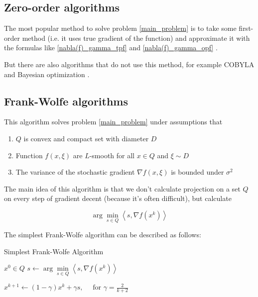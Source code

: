 \documentclass{article}
\begin{document}
    \subsection{Zero-order algorithms}\label{Zero_order_methods}

        The most popular method to solve problem \eqref{main_problem} is to take some first-order method (i.e. it uses true gradient of the function) and approximate it with the formulas like \eqref{nabla(f)_gamma_tpf} and \eqref{nabla(f)_gamma_opf} \cite{Randomized_gradient_free_methods_in_convex_optimization, akhtar2022zeroth, nesterov2017random, gasnikov2017stochastic}.

        But there are also algorithms that do not use this method, for example COBYLA \cite{powell1994direct} and Bayesian optimization \cite{hernandez2016general}.

        

    \subsection{Frank-Wolfe algorithms} \label{FW_algorithms}

        This algorithm solves problem \eqref{main_problem} under assumptions that
        
        \begin{enumerate}
            \item $Q$ is convex and compact set with diameter $D$

            \item Function $f(x, \xi)$ are $L$-smooth for all $x \in Q$ and $\xi \sim D$

            \item The variance of the stochastic gradient $\nabla f(x, \xi)$ is bounded under $\sigma^2$
        \end{enumerate}

        The main idea of this algorithm is that we don't calculate projection on a set $Q$ on every step of gradient decent (because it's often difficult), but calculate

        \begin{equation*}
            \arg\underset{s \in Q}{\min} \left<s, \nabla f(x^k)\right>
        \end{equation*}

        The simplest Frank-Wolfe algorithm can be described as follows: 

        \begin{algorithm}
            \caption{Simplest Frank-Wolfe Algorithm}\label{simple_FW}
            \begin{algorithmic}
                \Ensure $x^0 \in Q$
                    \State $s \gets \arg\underset{s \in Q}{\min} \left<s, \nabla f(x^k)\right>$

                    \State $x^{k+1} \gets (1 - \gamma)x^k + \gamma s, \quad \text{ for } \gamma = \frac{2}{k+2}$
                \EndFor
            \end{algorithmic}
        \end{algorithm}
\end{document}
